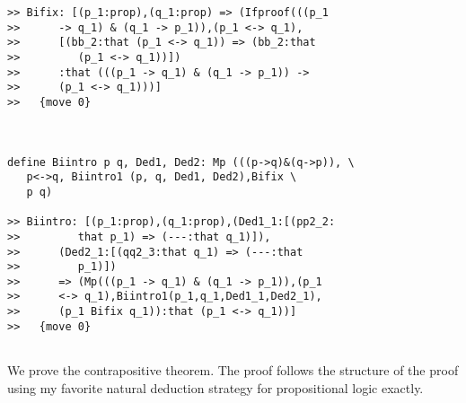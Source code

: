 \documentclass[12pt]{article}
\begin{document}
\begin{verbatim}
>> Bifix: [(p_1:prop),(q_1:prop) => (Ifproof(((p_1
>>      -> q_1) & (q_1 -> p_1)),(p_1 <-> q_1),
>>      [(bb_2:that (p_1 <-> q_1)) => (bb_2:that
>>         (p_1 <-> q_1))])
>>      :that (((p_1 -> q_1) & (q_1 -> p_1)) ->
>>      (p_1 <-> q_1)))]
>>   {move 0}



define Biintro p q, Ded1, Ded2: Mp (((p->q)&(q->p)), \
   p<->q, Biintro1 (p, q, Ded1, Ded2),Bifix \
   p q)

>> Biintro: [(p_1:prop),(q_1:prop),(Ded1_1:[(pp2_2:
>>         that p_1) => (---:that q_1)]),
>>      (Ded2_1:[(qq2_3:that q_1) => (---:that
>>         p_1)])
>>      => (Mp(((p_1 -> q_1) & (q_1 -> p_1)),(p_1
>>      <-> q_1),Biintro1(p_1,q_1,Ded1_1,Ded2_1),
>>      (p_1 Bifix q_1)):that (p_1 <-> q_1))]
>>   {move 0}


\end{verbatim}

We prove the contrapositive theorem.  The proof follows the structure of the proof using  my favorite natural deduction strategy for propositional logic exactly.
\end{document}
